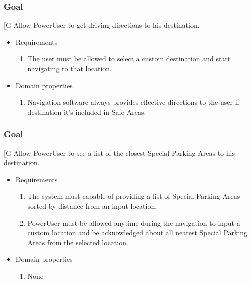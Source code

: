     \subsubsection{Goal }
    {[}G\arabic{goalctr}{]}
    Allow PowerUser to get driving directions to his destination.
    \begin{itemize}
        \item Requirements
        \begin{enumerate}[REQ]
    			\item The user must be allowed to select a custom destination and start navigating to that location.
        \end{enumerate}
        \item Domain properties
        \begin{enumerate}[PRO]
    			\item Navigation software always provides effective directions to the user if destination it's included in Safe Areas.
        \end{enumerate}
    \end{itemize}

    \subsubsection{Goal }
    {[}G\arabic{goalctr}{]}
    Allow PowerUser to see a list of the closest Special Parking Areas to his destination.
    \begin{itemize}
        \item Requirements
        \begin{enumerate}[REQ]
    		\item The system must capable of providing a list of Special Parking Areas sorted by distance from an input location.
			\item PowerUser must be allowed anytime during the navigation to input a custom location and be acknowledged about all nearest Special Parking Areas from the selected location.
        \end{enumerate}
        \item Domain properties
        \begin{enumerate}[PRO]
    			\item None
        \end{enumerate}
    \end{itemize}
    
